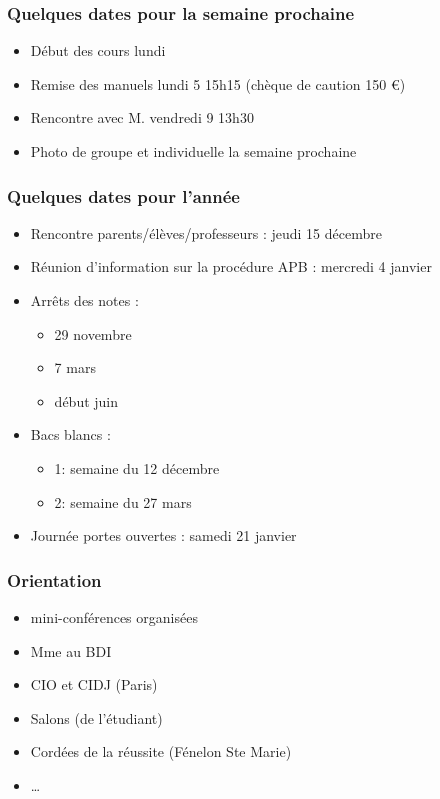 \documentclass[frenchb]{beamer}
\begin{document}
\begin{frame}
  \frametitle{Quelques dates pour la semaine prochaine}
  \begin{itemize}[<+->]
    \item Début des cours lundi
    \item Remise des manuels lundi 5 15h15 (chèque de caution 150 €)
    \item Rencontre avec M.  vendredi 9 13h30
    \item Photo de groupe et individuelle la semaine prochaine
  \end{itemize}
\end{frame}

\begin{frame}
  \frametitle{Quelques dates pour l'année}
  \begin{itemize}[<+->]
    \item Rencontre parents/élèves/professeurs : jeudi 15 décembre
    \item Réunion d'information sur la procédure APB : mercredi 4
      janvier
    \item Arrêts des notes :
      \begin{itemize}
        \item 29 novembre
        \item 7 mars
        \item début juin
      \end{itemize}
    \item Bacs blancs :
      \begin{itemize}
        \item 1\ier : semaine du 12 décembre
        \item 2\ieme : semaine du 27 mars
      \end{itemize}
    \item Journée portes ouvertes : samedi 21 janvier
  \end{itemize}
\end{frame}

\begin{frame}
  \frametitle{Orientation}
  \begin{itemize}[<+->]
    \item mini-conférences organisées
    \item Mme  au BDI
    \item CIO et CIDJ (Paris)
    \item Salons (de l'étudiant)
    \item Cordées de la réussite (Fénelon Ste Marie)
    \item …
  \end{itemize}
\end{frame}
\end{document}
